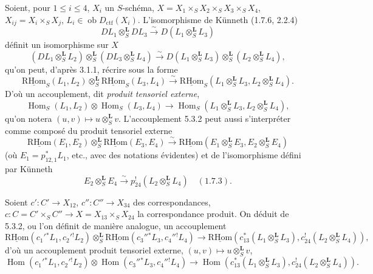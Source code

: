 \documentclass[11pt]{article}
\DeclareMathOperator{\Hom}{Hom}
\newcommand{\R}{\mathrm{R}}\newcommand{\RHomCore}{\mathrm{RHom}}
\providecommand{\RHom}{\RHomCore}
\providecommand{\uRHom}{\underline{\RHom}}
\providecommand{\RHom}{\RHomCore}
\providecommand{\Hom}{\operatorname{Hom}}
\providecommand{\RHom}{\R\mathcal{H}om}
\providecommand{\R}{\mathrm R}
\providecommand{\RHom}{\RHomCore}
\providecommand{\Hom}{\operatorname{Hom}}
\begin{document}
Soient, pour $1\leq i\leq 4$, $X_i$ un $S$-schéma, $X=X_1\times_SX_2\times_SX_3\times_SX_4$, $X_{ij}=X_i\times_SX_j$, $L_i\in\operatorname{ob}D_{\mathrm{ctf}}(X_i)$. L'isomorphisme de Künneth (1.7.6, 2.2.4)
\[
DL_1\otimes_S^{\mathbf L}DL_3\xrightarrow{\sim}D(L_1\otimes_S^{\mathbf L}L_3)
\]
définit un isomorphisme sur $X$
\begin{equation}
\tag{5.3.1}
(DL_1\otimes_S^{\mathbf L}L_2)\otimes_S^{\mathbf L}(DL_3\otimes_S^{\mathbf L}L_4)
\xrightarrow{\sim}D(L_1\otimes_S^{\mathbf L}L_3)\otimes_S^{\mathbf L}(L_2\otimes_S^{\mathbf L}L_4),
\end{equation}
qu'on peut, d'après 3.1.1, récrire sous la forme
\begin{equation}
\tag{5.3.2}
\uRHom_S(L_1,L_2)\otimes_S^{\mathbf L}\uRHom_S(L_3,L_4)
\xrightarrow{\sim}\uRHom_S(L_1\otimes_S^{\mathbf L}L_3,L_2\otimes_S^{\mathbf L}L_4).
\end{equation}
D'où un accouplement, dit \emph{produit tensoriel externe},
\begin{equation}
\tag{5.3.3}
\Hom_S(L_1,L_2)\otimes\Hom_S(L_3,L_4)
\longrightarrow\Hom_S(L_1\otimes_S^{\mathbf L}L_3,L_2\otimes_S^{\mathbf L}L_4),
\end{equation}
qu'on notera $(u,v)\mapsto u\otimes_S^{\mathbf L}v$. L'accouplement 5.3.2 peut aussi s'interpréter comme composé du produit tensoriel externe
\[
\uRHom(E_1,E_2)\otimes_S^{\mathbf L}\uRHom(E_3,E_4)
\xrightarrow{\sim}\uRHom(E_1\otimes_S^{\mathbf L}E_3,E_2\otimes_S^{\mathbf L}E_4)
\]
(où $E_1=p_{12,1}^*L_1$, etc., avec des notations évidentes) et de l'isomorphisme défini par Künneth
\[
E_2\otimes_S^{\mathbf L}E_4\xrightarrow{\sim}p_{24}^!(L_2\otimes_S^{\mathbf L}L_4)\quad (1.7.3).
\]

Soient $c':C'\to X_{12}$, $c'':C''\to X_{34}$ des correspondances, $c:C=C'\times_SC''\to X=X_{13}\times_SX_{24}$ la correspondance produit. On déduit de 5.3.2, ou l'on définit de manière analogue, un accouplement
\begin{equation}
\tag{5.3.4}
\uRHom(c_1'{}^*L_1,c_2'{}^!L_2)\otimes_S^{\mathbf L}\uRHom(c_3''{}^*L_3,c_4''{}^!L_4)
\longrightarrow\uRHom(c_{13}^*(L_1\otimes_S^{\mathbf L}L_3),c_{24}^!(L_2\otimes_S^{\mathbf L}L_4)),
\end{equation}
d'où un accouplement produit tensoriel externe, $(u,v)\mapsto u\otimes_S^{\mathbf L}v$,
\begin{equation}
\tag{5.3.5}
\Hom(c_1'{}^*L_1,c_2'{}^!L_2)\otimes\Hom(c_3''{}^*L_3,c_4''{}^!L_4)
\longrightarrow\Hom(c_{13}^*(L_1\otimes_S^{\mathbf L}L_3),c_{24}^!(L_2\otimes_S^{\mathbf L}L_4)).
\end{equation}
\end{document}
